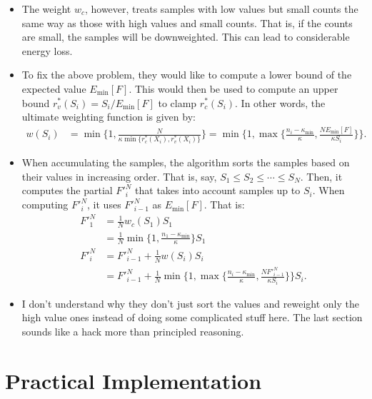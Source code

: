 \documentclass[10pt]{article}
\begin{document}
\begin{itemize}
  	\item The weight $w_c$, however, treats samples with low values but small counts the same way as those with high values and small counts. That is, if the counts are small, the samples will be downweighted. This can lead to considerable energy loss. 

  	\item To fix the above problem, they would like to compute a lower bound of the expected value $E_{\min}[F]$. This would then be used to compute an upper bound $r_v^*(S_i) = S_i/E_{\min}[F]$ to clamp $r_c^*(S_i)$. In other words, the ultimate weighting function is given by:
  	\begin{align*}
  		w(S_i) 
  		&= \min\bigg\{ 1, \frac{N}{\kappa \min\{r^*_c(X_i), r^*_v(X_i)\} } \bigg\}
  		= \min\bigg\{ 1, \max \Big\{ \frac{n_i - \kappa_{\min}}{\kappa}, \frac{N E_{\min}[F]}{\kappa S_i} \Big\} \bigg\}.
  	\end{align*}

  	\item When accumulating the samples, the algorithm sorts the samples based on their values in increasing order. That is, say, $S_1 \leq S_2 \leq \dotsm \leq S_N$. Then, it computes the partial $F'^N_i$ that takes into account samples up to $S_i$. When computing $F'^N_i$, it uses $F'^N_{i-1}$ as $E_{\min}[F]$. That is:
  	\begin{align*}
  		F'^N_1 
  		&= \frac{1}{N} w_c(S_1) S_1 \\
  		&= \frac{1}{N} \min\bigg\{1, \frac{n_1 - \kappa_{\min}}{\kappa}\bigg\} S_1\\
  		F'^N_i
  		&= F'^N_{i-1} + \frac{1}{N} w(S_i) S_i\\
  		&= F'^N_{i-1} + \frac{1}{N} \min\bigg\{ 1, \max \Big\{ \frac{n_i - \kappa_{\min}}{\kappa}, \frac{N F'^N_{i-1}}{\kappa S_i} \Big\} \bigg\} S_i.
  	\end{align*}

  	\item I don't understand why they don't just sort the values and reweight only the high value ones instead of doing some complicated stuff here. The last section sounds like a hack more than principled reasoning.
  	
  \end{itemize}

  \section{Practical Implementation}
\end{document}
